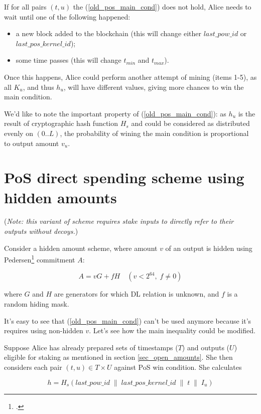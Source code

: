 \documentclass{article}
\numberwithin{figure}{section}
\begin{document}
If for all pairs $(t, u)$ the (\ref{old_pos_main_cond}) does not hold, Alice needs to wait until one of the following happened:
\begin{itemize}
    \item a new block added to the blockchain (this will change either $last\_pow\_id$ or $last\_pos\_kernel\_id$);
    \item some time passes (this will change $t_{min}$ and $t_{max}$).
\end{itemize}

\indent
Once this happens, Alice could perform another attempt of mining (items 1-5), as all $K_u$, and thus $h_u$, will have different values, giving more chances to win the main condition.


We'd like to note the important property of (\ref{old_pos_main_cond}): as $h_u$ is the result of cryptographic hash function $H_s$ and could be considered as distributed evenly on $(0..L)$, the probability of wining the main condition is proportional to output amount $v_u$. 


\section{PoS direct spending scheme using hidden amounts} \label{sec_direct_spend}

\noindent (\textit{Note: this variant of scheme requires stake inputs to directly refer to their outputs without decoys.})

Consider a hidden amount scheme, where amount $v$ of an output is hidden using Pedersen\footcite[More information in original paper by T.P. Pedersen: ][]{Ped} commitment $A$:

\[ A = v G + f H \quad (v < 2^{64}, \; f \neq 0) \]

where $G$ and $H$ are generators for which DL relation is unknown, and $f$ is a random hiding mask.

It's easy to see that (\ref{old_pos_main_cond}) can't be used anymore because it's requires using non-hidden $v$. Let's see how the main inequality could be modified.

Suppose Alice has already prepared sets of timestamps ($T$) and outputs ($U$) eligible for staking as mentioned in section \ref{sec_open_amounts}. She then considers each pair $(t, u) \in T \times U$ against PoS win condition. She calculates

\[ h = H_s( last\_pow\_id \;\|\; last\_pos\_kernel\_id \;\|\; t \;\|\; I_u ) \]
\end{document}
